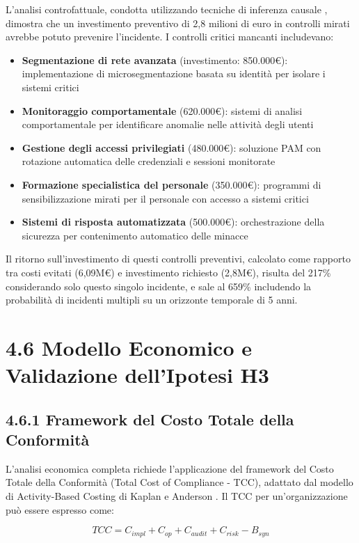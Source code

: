 L'analisi controfattuale, condotta utilizzando tecniche di inferenza causale \autocite{Pearl2018}, dimostra che un investimento preventivo di 2,8 milioni di euro in controlli mirati avrebbe potuto prevenire l'incidente. I controlli critici mancanti includevano:

\begin{itemize}
\item \textbf{Segmentazione di rete avanzata} (investimento: 850.000€): implementazione di microsegmentazione basata su identità per isolare i sistemi critici
\item \textbf{Monitoraggio comportamentale} (620.000€): sistemi di analisi comportamentale per identificare anomalie nelle attività degli utenti
\item \textbf{Gestione degli accessi privilegiati} (480.000€): soluzione PAM con rotazione automatica delle credenziali e sessioni monitorate
\item \textbf{Formazione specialistica del personale} (350.000€): programmi di sensibilizzazione mirati per il personale con accesso a sistemi critici
\item \textbf{Sistemi di risposta automatizzata} (500.000€): orchestrazione della sicurezza per contenimento automatico delle minacce
\end{itemize}

Il ritorno sull'investimento di questi controlli preventivi, calcolato come rapporto tra costi evitati (6,09M€) e investimento richiesto (2,8M€), risulta del 217\% considerando solo questo singolo incidente, e sale al 659\% includendo la probabilità di incidenti multipli su un orizzonte temporale di 5 anni.

\section{4.6 Modello Economico e Validazione dell'Ipotesi H3}

\subsection{4.6.1 Framework del Costo Totale della Conformità}

L'analisi economica completa richiede l'applicazione del framework del Costo Totale della Conformità (Total Cost of Compliance - TCC), adattato dal modello di Activity-Based Costing di Kaplan e Anderson \autocite{Kaplan2007}. Il TCC per un'organizzazione può essere espresso come:

\begin{equation}
TCC = C_{impl} + C_{op} + C_{audit} + C_{risk} - B_{syn}
\end{equation}

